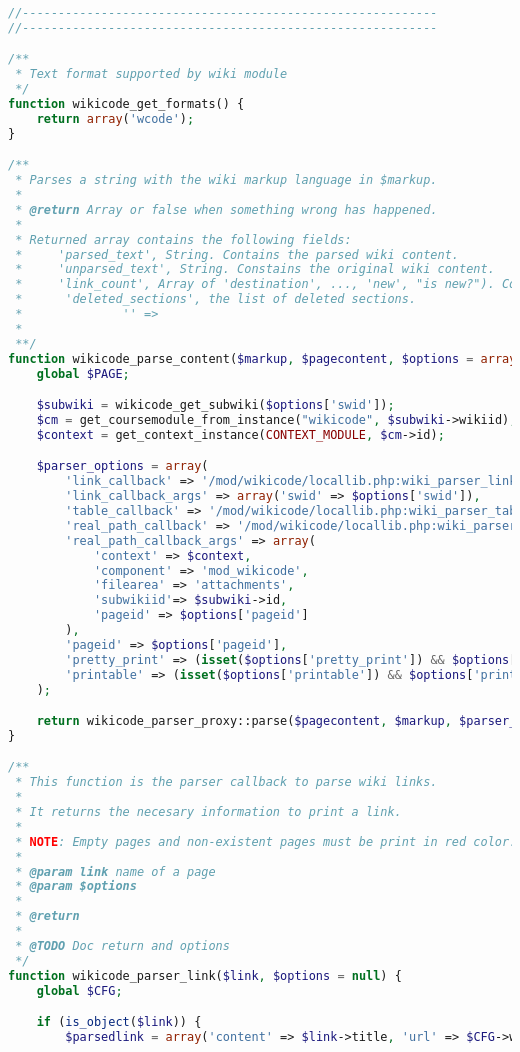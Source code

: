 \begin{lstlisting}[language=PHP]
//----------------------------------------------------------
//----------------------------------------------------------

/**
 * Text format supported by wiki module
 */
function wikicode_get_formats() {
    return array('wcode');
}

/**
 * Parses a string with the wiki markup language in $markup.
 *
 * @return Array or false when something wrong has happened.
 *
 * Returned array contains the following fields:
 *     'parsed_text', String. Contains the parsed wiki content.
 *     'unparsed_text', String. Constains the original wiki content.
 *     'link_count', Array of 'destination', ..., 'new', "is new?"). Contains the internal wiki links found in the wiki content.
 *      'deleted_sections', the list of deleted sections.
 *              '' =>
 *
 **/
function wikicode_parse_content($markup, $pagecontent, $options = array()) {
    global $PAGE;

    $subwiki = wikicode_get_subwiki($options['swid']);
    $cm = get_coursemodule_from_instance("wikicode", $subwiki->wikiid);
    $context = get_context_instance(CONTEXT_MODULE, $cm->id);

    $parser_options = array(
        'link_callback' => '/mod/wikicode/locallib.php:wiki_parser_link',
        'link_callback_args' => array('swid' => $options['swid']),
        'table_callback' => '/mod/wikicode/locallib.php:wiki_parser_table',
        'real_path_callback' => '/mod/wikicode/locallib.php:wiki_parser_real_path',
        'real_path_callback_args' => array(
            'context' => $context,
            'component' => 'mod_wikicode',
            'filearea' => 'attachments',
            'subwikiid'=> $subwiki->id,
            'pageid' => $options['pageid']
        ),
        'pageid' => $options['pageid'],
        'pretty_print' => (isset($options['pretty_print']) && $options['pretty_print']),
        'printable' => (isset($options['printable']) && $options['printable'])
    );

    return wikicode_parser_proxy::parse($pagecontent, $markup, $parser_options);
}

/**
 * This function is the parser callback to parse wiki links.
 *
 * It returns the necesary information to print a link.
 *
 * NOTE: Empty pages and non-existent pages must be print in red color.
 *
 * @param link name of a page
 * @param $options
 *
 * @return
 *
 * @TODO Doc return and options
 */
function wikicode_parser_link($link, $options = null) {
    global $CFG;

    if (is_object($link)) {
        $parsedlink = array('content' => $link->title, 'url' => $CFG->wwwroot . '/mod/wikicode/view.php?pageid=' . $link->id, 'new' => false, 'link_info' => array('link' => $link->title, 'pageid' => $link->id, 'new' => false));


\end{lstlisting}
